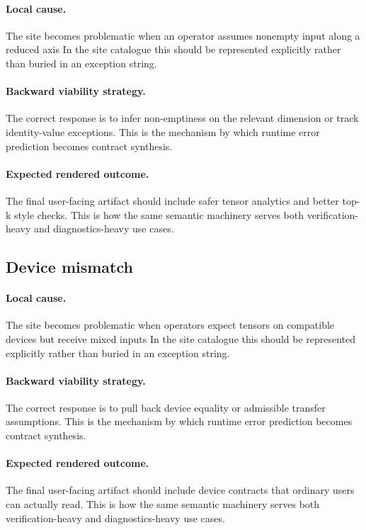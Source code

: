 \documentclass[11pt]{report}
\theoremstyle{definition}
\theoremstyle{plain}
\begin{document}
\paragraph{Local cause.}
The site becomes problematic when an operator assumes nonempty input along a reduced axis In the site catalogue this should be
represented explicitly rather than buried in an exception string.

\paragraph{Backward viability strategy.}
The correct response is to infer non-emptiness on the relevant dimension or track identity-value exceptions. This is the mechanism by which runtime
error prediction becomes contract synthesis.

\paragraph{Expected rendered outcome.}
The final user-facing artifact should include safer tensor analytics and better top-k style checks. This is how the same
semantic machinery serves both verification-heavy and diagnostics-heavy use
cases.

\subsection{Device mismatch}

\paragraph{Local cause.}
The site becomes problematic when operators expect tensors on compatible devices but receive mixed inputs In the site catalogue this should be
represented explicitly rather than buried in an exception string.

\paragraph{Backward viability strategy.}
The correct response is to pull back device equality or admissible transfer assumptions. This is the mechanism by which runtime
error prediction becomes contract synthesis.

\paragraph{Expected rendered outcome.}
The final user-facing artifact should include device contracts that ordinary users can actually read. This is how the same
semantic machinery serves both verification-heavy and diagnostics-heavy use
cases.
\end{document}
